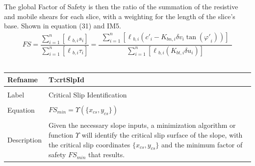 \documentclass[12pt]{article}
\begin{document}
The global Factor of Safety is then the ratio of the summation of the resistive and mobile shears for each slice, with a weighting for the length of the slice's base. Shown in equation (31) and IM5.
\begin{dmath}
FS=\frac{\displaystyle\sum_{i=1}^{n}{\left[{\ell{}_{b,i}} s_{i}\right]}}{\displaystyle\sum_{i=1}^{n}{\left[{\ell{}_{b,i}} \tau{}_{i}\right]}}=\frac{\begin{multlined}
\displaystyle\sum_{i=1}^{n}{\left[{\ell{}_{b,i}} \left({c'}_{i}-{K_{bn,i}} {\delta{}v}_{i} \tan\left({\varphi{}'}_{i}\right)\right)\right]}
\end{multlined}
}{\displaystyle\sum_{i=1}^{n}{\left[{\ell{}_{b,i}} \left({K_{bt,i}} {\delta{}u}_{i}\right)\right]}}
\end{dmath}
~\newline
\noindent \begin{minipage}{\textwidth}
\begin{tabular}{p{} p{}}
\toprule \textbf{Refname} & \textbf{T:crtSlpId}
\label{T:crtSlpId}
\\ \midrule \\
Label & Critical Slip Identification
\\ \midrule \\
Equation & ${FS_{min}}=\Upsilon{}\left(\{{x_{cs}}{,y_{cs}}\}\right)$
\\ \midrule \\
Description & Given the necessary slope inputs, a minimization algorithm or function $\Upsilon{}$ will identify the critical slip surface of the slope, with the critical slip coordinates $\{{x_{cs}}{,y_{cs}}\}$ and the minimum factor of safety ${FS_{min}}$ that results.
\\ \bottomrule \end{tabular}
\end{minipage}\\
\end{document}
